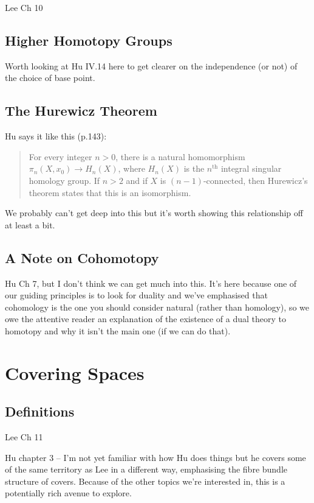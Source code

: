 \documentclass[oneside,english]{amsbook}
\numberwithin{section}{chapter}
\theoremstyle{plain}
\theoremstyle{definition}
\begin{document}
	Lee Ch 10
	
	\section{Higher Homotopy Groups}
	
	Worth looking at Hu IV.14 here to get clearer on the independence (or not) of the choice of base point.

	\section{The Hurewicz Theorem}
	
	Hu says it like this (p.143):
	\begin{quote}
		For every integer $n > 0$, there is a natural homomorphism $\pi_n(X, x_0)\to H_n(X)$, where $H_n(X)$ is the $n^\text{th}$ integral singular homology group. If $n > 2$ and if $X$ is $(n - 1)$-connected, then Hurewicz's theorem states that this is an isomorphism. 
	\end{quote}
	
	We probably can't get deep into this but it's worth showing this relationship off at least a bit.
	
	\section{A Note on Cohomotopy}
	
	Hu Ch 7, but I don't think we can get much into this. It's here because one of our guiding principles is to look for duality and we've emphasised that cohomology is the one you should consider natural (rather than homology), so we owe the attentive reader an explanation of the existence of a dual theory to homotopy and why it isn't the main one (if we can do that).	

	\chapter{Covering Spaces}
	
	\section{Definitions}
	
	Lee Ch 11
	
	Hu chapter 3 -- I'm not yet familiar with how Hu does things but he covers some of the same territory as Lee in a different way, emphasising the fibre bundle structure of covers. Because of the other topics we're interested in, this is a potentially rich avenue to explore.
	
\end{document}
